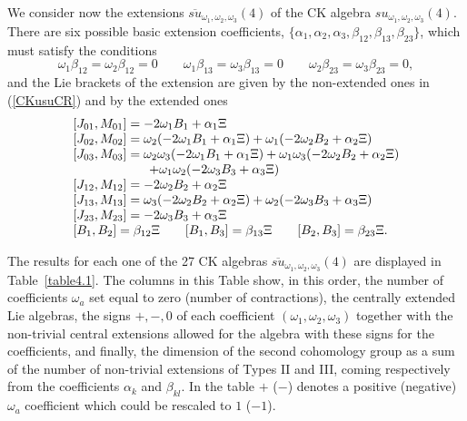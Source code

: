 \documentclass[12pt]{article}
\begin{document}
We consider now the extensions $\overline{su}_{{\omega}_1,{\omega}_2,{\omega}_3}(4)$ of
the CK algebra ${su}_{{\omega}_1,{\omega}_2,{\omega}_3}(4)$. There are six possible
basic extension coefficients, $\{{\alpha}_{1},{\alpha}_{2},{\alpha}_{3},
{\beta}_{12},{\beta}_{13},{\beta}_{23}\}$, which must satisfy the
conditions
\begin{equation}
{\omega}_1 {\beta}_{12}={\omega}_2 {\beta}_{12}=0   \qquad
{\omega}_1 {\beta}_{13}={\omega}_3 {\beta}_{13}=0   \qquad
{\omega}_2 {\beta}_{23}={\omega}_3 {\beta}_{23}=0,
\end{equation}
and the Lie brackets of the extension are given by the non-extended
ones in (\ref{CKusuCR}) and by the extended ones
\begin{equation}
\begin{array}{l}
[{J}_{01},{M}_{01}] =-2{\omega}_1{B}_1+{\alpha}_{1}\Xi\cr
[{J}_{02},{M}_{02}] ={\omega}_2(-2{\omega}_1 {B}_1 + {\alpha}_{1}\Xi)+{\omega}_1(
-2{\omega}_2 {B}_2 +   {\alpha}_{2}\Xi   )\cr
[{J}_{03},{M}_{03}] ={\omega}_2{\omega}_3(-2{\omega}_1 {B}_1 + {\alpha}_{1}\Xi)
 +{\omega}_1{\omega}_3( -2{\omega}_2 {B}_2 +   {\alpha}_{2}\Xi   ) \cr
\qquad\qquad\qquad
 +{\omega}_1{\omega}_2( -2{\omega}_3 {B}_3 +   {\alpha}_{3}\Xi   )\cr
[{J}_{12},{M}_{12}] =-2{\omega}_2{B}_2 +   {\alpha}_{2}\Xi\cr
[{J}_{13},{M}_{13}] ={\omega}_3(-2{\omega}_2 {B}_2 + {\alpha}_{2}\Xi)+{\omega}_2(
-2{\omega}_3 {B}_3 +   {\alpha}_{3}\Xi   )\cr
[{J}_{23},{M}_{23}] =-2{\omega}_3{B}_3 +   {\alpha}_{3}\Xi\cr
[{B}_1,{B}_2]={\beta}_{12}\Xi \qquad [{B}_1,{B}_3]={\beta}_{13}\Xi \qquad
[{B}_2,{B}_3]={\beta}_{23}\Xi .
\end{array}
\label{qf}
\end{equation}

The results for each one of the 27 CK algebras
$\overline{su}_{{\omega}_1,{\omega}_2,{\omega}_3}(4)$ are displayed in Table~\ref{table4.1}.
The columns in this Table show, in this order, the number of coefficients
${\omega}_a$ set equal to zero (number of contractions), the centrally
extended Lie algebras, the signs $+, -, 0$ of each
coefficient $({\omega}_1,{\omega}_2,{\omega}_3)$  together with the  non-trivial central
extensions  allowed for the algebra with these signs for the coefficients,
and finally, the dimension of the second cohomology group as a sum of
the number of non-trivial extensions of Types II and III, coming
respectively from the coefficients ${\alpha}_{k}$ and ${\beta}_{kl}$. In the
table $+$ ($-$) denotes a positive (negative) ${\omega}_a$ coefficient which could be
rescaled to $1$ ($-1$).
\end{document}
